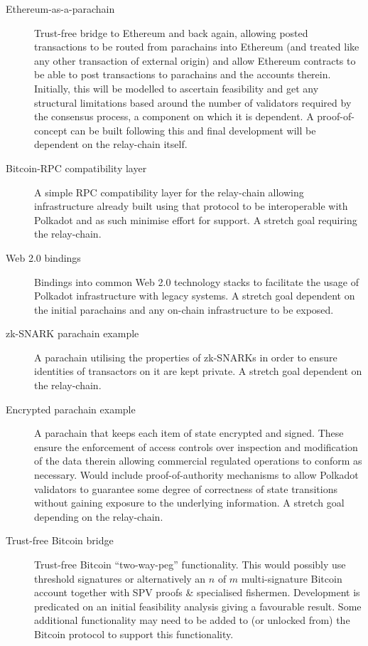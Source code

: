 \begin{description}
\item[Ethereum-as-a-parachain] Trust-free bridge to Ethereum and back again, allowing posted transactions to be routed from parachains into Ethereum (and treated like any other transaction of external origin) and allow Ethereum contracts to be able to post transactions to parachains and the accounts therein. Initially, this will be modelled to ascertain feasibility and get any structural limitations based around the number of validators required by the consensus process, a component on which it is dependent. A proof-of-concept can be built following this and final development will be dependent on the relay-chain itself.

\item[Bitcoin-RPC compatibility layer] A simple RPC compatibility layer for the relay-chain allowing infrastructure already built using that protocol to be interoperable with Polkadot and as such minimise effort for support. A stretch goal requiring the relay-chain.

\item[Web 2.0 bindings] Bindings into common Web 2.0 technology stacks to facilitate the usage of Polkadot infrastructure with legacy systems. A stretch goal dependent on the initial parachains and any on-chain infrastructure to be exposed.

\item[zk-SNARK parachain example] A parachain utilising the properties of zk-SNARKs in order to ensure identities of transactors on it are kept private. A stretch goal dependent on the relay-chain.

\item[Encrypted parachain example] A parachain that keeps each item of state encrypted and signed. These ensure the enforcement of access controls over inspection and modification of the data therein allowing commercial regulated operations to conform as necessary. Would include proof-of-authority mechanisms to allow Polkadot validators to guarantee some degree of correctness of state transitions without gaining exposure  to the underlying information. A stretch goal depending on the relay-chain.

\item[Trust-free Bitcoin bridge] Trust-free Bitcoin ``two-way-peg'' functionality. This would possibly use threshold signatures or alternatively an $n$ of $m$ multi-signature Bitcoin account together with SPV proofs \& specialised fishermen. Development is predicated on an initial feasibility analysis giving a favourable result. Some additional functionality may need to be added to (or unlocked from) the Bitcoin protocol to support this functionality.


\end{description}
